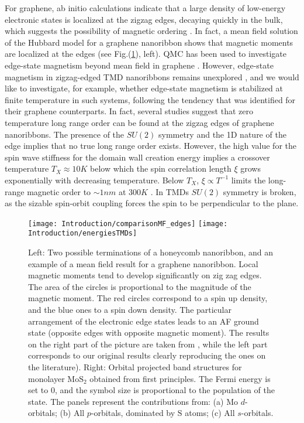 For graphene, ab initio calculations indicate that a large density of low-energy electronic states is localized at the zigzag edges, decaying quickly in the bulk, which suggests the possibility of magnetic ordering \cite{yazyev_emergence_2010}.
In fact, a mean field solution of the Hubbard model for a graphene nanoribbon shows that magnetic moments are localized at the edges \cite{yazyev_emergence_2010} (see Fig.(\ref{fig:nanoribbons_energiesTMDs}), left).
QMC has been used to investigate edge-state magnetism beyond mean field in graphene \cite{feldner_dynamical_2011, golor_quantum_2013, cheng_strain-induced_2015, raczkowski_interplay_2017, yang_strain-tuning_2017}.
However, edge-state magnetism in zigzag-edged \ac{TMD} nanoribbons remains unexplored \cite{davelou_nanoribbon_2017}, and we would like to investigate, for example, whether edge-state magnetism is stabilized at finite temperature in such systems, following the tendency that was identified for their graphene counterparts.
In fact, several studies suggest that zero temperature long range order can be found at the zigzag edges of graphene nanoribbons.
The presence of the $SU(2)$ symmetry and the \acs{1D} nature of the edge implies that no true long range order exists.
However, the high value for the spin wave stiffness for the domain wall creation energy implies a crossover temperature $T_X \approx 10 K$ below which the spin correlation length $\xi$ grows exponentially with decreasing temperature.
Below $T_X$, $\xi \propto T^{-1}$ limits the long-range magnetic order to $\sim 1 nm$ at $300 K$ \cite{yazyev_magnetic_2008}. 
In \acs{TMD}s $SU(2)$ symmetry is broken, as the sizable spin-orbit coupling forces the spin to be perpendicular to the plane.
\begin{figure}[H]
\texttt{[image: Introduction/comparisonMF\_edges]}
\hspace{5mm}
\texttt{[image: Introduction/energiesTMDs]}
 \caption[Zigzag edges of a nanoribbon and magnetism. Orbital projected band structures for monolayer $\text{Mo}\text{S}_2$ obtained from first principles.]{Left: Two possible terminations of a honeycomb nanoribbon, and an example of a mean field result for a  graphene nanoribbon.
Local magnetic moments tend to develop significantly on zig zag edges.
The area of the circles is proportional to the magnitude of the magnetic moment.
The red circles correspond to a spin up density, and the blue ones to a spin down density.
The particular arrangement of the electronic edge states leads to an \ac{AF} ground state (opposite edges with opposite magnetic moment). The results on the right part of the picture are taken from \cite{yazyev_emergence_2010}, while the left part corresponds to our original results clearly reproducing the ones on the literature). Right: Orbital projected band structures for monolayer $\text{Mo}\text{S}_2$ obtained from first principles.
The Fermi energy is set to 0, and the symbol size is proportional to the population of the state.
The panels represent the contributions from: (a) $\text{Mo}$ $d$-orbitals; (b) All $p$-orbitals, dominated by $\text{S}$ atoms; (c) All $s$-orbitals. \label{fig:nanoribbons_energiesTMDs}}
\end{figure}

